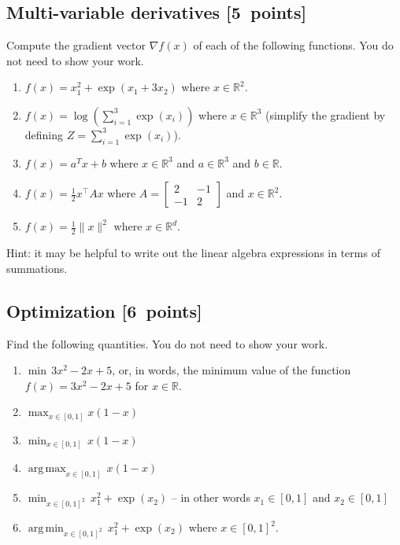 \documentclass{article}
\newcommand{\blu}[1]{{\textcolor{blu}{#1}}}
\let\ask\blu
\newcommand\pts[1]{\textcolor{pointscolour}{[#1~points]}}
\def\R{\mathbb{R}}
\DeclareMathOperator*{\argmax}{arg\,max}
\DeclareMathOperator*{\argmin}{arg\,min}
\newcommand{\norm}[1]{\lVert #1 \rVert}
\begin{document}
  \subsection{Multi-variable derivatives \pts{5}}
  \label{sub.multi.var}

  \ask{Compute the gradient vector $\nabla f(x)$ of each of the following functions.} You do not need to show your work.
  \begin{enumerate}
  \item $f(x) = x_1^2 + \exp(x_1 + 3x_2)$ where $x \in \R^2$.
  \item $f(x) = \log\left(\sum_{i=1}^3\exp(x_i)\right)$ where $x \in \R^3$ (simplify the gradient by defining $Z = \sum_{i=1}^3\exp(x_i)$).
  \item $f(x) = a^Tx + b$ where $x \in \R^3$ and $a \in \R^3$ and $b \in \R$.
  \item $f(x) = \frac12 x^\top A x$ where $A=\left[ \begin{array}{cc}
  2 & -1 \\
  -1 & 2 \end{array} \right]$ and $x \in \mathbb{R}^2$.
  \item $f(x) = \frac{1}{2}\norm{x}^2$ where $x \in \R^d$.
  \end{enumerate}

  Hint: it may be helpful to write out the linear algebra expressions in terms of summations.


  \subsection{Optimization \pts{6}}

  \ask{Find the following quantities.} You do not need to show your work.

  \begin{enumerate}
  \item $\min \, 3x^2-2x+5$, or, in words, the minimum value of the function $f(x) = 3x^2 -2x + 5$ for $x \in \R$.
  \item $\max_{x \in [0, 1]} x(1-x)$
  \item $\min_{x \in [0, 1]} \, x(1-x)$
  \item $\argmax_{x \in [0,1]} \, x(1-x)$
  \item $\min_{x \in [0, 1]^2} \, x_1^2 + \exp(x_2)$ -- in other words $x_1\in [0,1]$ and $x_2\in [0,1]$
  \item $\argmin_{x \in [0,1]^2} \, x_1^2 + \exp(x_2)$ where $x \in [0,1]^2$.
  \end{enumerate}
\end{document}
